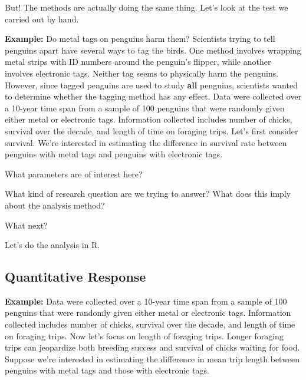 \documentclass[
  letterpaper,
  DIV=11,
  numbers=noendperiod]{scrartcl}
\begin{document}
But! The methods are actually doing the same thing. Let's look at the
test we carried out by hand.

\hfill\break
\hfill\break
\hfill\break
\hfill\break
\hfill\break
\hfill\break
\hfill\break
\hfill\break
\hfill\break
\hfill\break
\hfill\break
\hfill\break
\hfill\break
\hfill\break
\hfill\break
\hfill\break
\hfill\break
\hfill\break
\hfill\break
\hfill\break

\newpage

\textbf{Example:} Do metal tags on penguins harm them? Scientists trying
to tell penguins apart have several ways to tag the birds. One method
involves wrapping metal strips with ID numbers around the penguin's
flipper, while another involves electronic tags. Neither tag seems to
physically harm the penguins. However, since tagged penguins are used to
study \textbf{all} penguins, scientists wanted to determine whether the
tagging method has any effect. Data were collected over a 10-year time
span from a sample of 100 penguins that were randomly given either metal
or electronic tags. Information collected includes number of chicks,
survival over the decade, and length of time on foraging trips. Let's
first consider survival. We're interested in estimating the difference
in survival rate between penguins with metal tags and penguins with
electronic tags.

What parameters are of interest here?

\hfill\break
\hfill\break
\hfill\break
\hfill\break
\hfill\break

What kind of research question are we trying to answer? What does this
imply about the analysis method?

\hfill\break
\hfill\break
\hfill\break
\hfill\break
\hfill\break
\hfill\break

What next?

\hfill\break
\hfill\break
\hfill\break
\hfill\break
\hfill\break
\hfill\break
\hfill\break

Let's do the analysis in R.

\hfill\break
\hfill\break
\hfill\break
\hfill\break
\hfill\break
\hfill\break

\subsection{Quantitative Response}\label{quantitative-response}

\textbf{Example:} Data were collected over a 10-year time span from a
sample of 100 penguins that were randomly given either metal or
electronic tags. Information collected includes number of chicks,
survival over the decade, and length of time on foraging trips. Now
let's focus on length of foraging trips. Longer foraging trips can
jeopardize both breeding success and survival of chicks waiting for
food. Suppose we're interested in estimating the difference in mean trip
length between penguins with metal tags and those with electronic tags.
\end{document}
